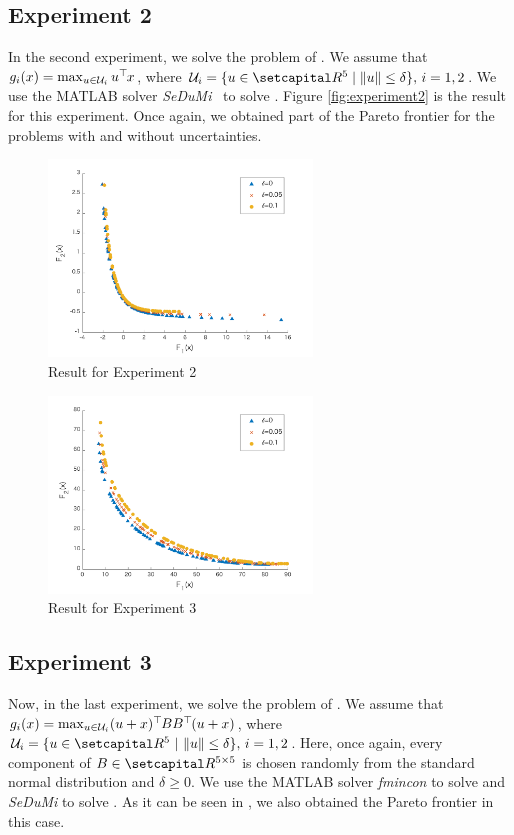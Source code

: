 \documentclass[../main]{subfiles}
\begin{document}
\subsection*{Experiment 2}
In the second experiment, we solve the problem of . We assume that $g_i(x) = \max_{u \in \mathcal{U}_i } u^\top\hspace{-1pt} x$, where $\mathcal{U}_i = \{u \in \setR^5 \mid \|u\| \leq \delta \},\, i = 1, 2$. We use the MATLAB solver \emph{SeDuMi}~\cite{Sturm1999} to solve . Figure \ref{fig:experiment2} is the result for this experiment. Once again, we obtained part of the Pareto frontier for the problems with and without uncertainties.
\begin{figure}[htbp]
\centering
\includegraphics[clip, width = 7.0cm]{figs/linear_ellipsoid_without_line_search}
\caption{Result for Experiment 2}
\end{figure}
\begin{figure}[thbp]
\centering
\includegraphics[clip, width = 7.0cm]{figs/quadratic_ellipsoid_without_line_search}
\caption{Result for Experiment 3}
\end{figure}
\subsection*{Experiment 3}
Now, in the last experiment, we solve the problem of . We assume that $g_i(x) = \max_{u \in \mathcal{U}_i } (u + x)^\top\hspace{-1pt} B B^\top\hspace{-1pt} (u + x)$, where $\mathcal{U}_i = \{u \in \setR^5\ | \  \|u\| \leq \delta \},\, i = 1, 2$. Here, once again, every component of $B \in \setR^{5 \times 5}$ is chosen randomly from the standard normal distribution and $\delta \geq 0$. We use the MATLAB solver \emph{fmincon} to solve  and \emph{SeDuMi} to solve . As it can be seen in , we also obtained the Pareto frontier in this case.
\end{document}
